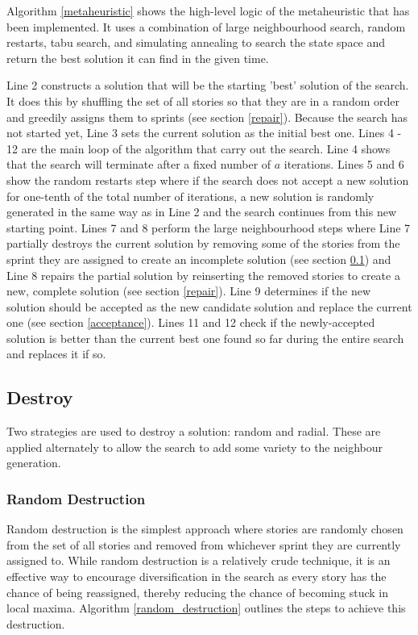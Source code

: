 Algorithm \ref{metaheuristic} shows the high-level logic of the metaheuristic that has been implemented. It uses a combination of large neighbourhood search, random restarts, tabu search, and simulating annealing to search the state space and return the best solution it can find in the given time.

Line 2 constructs a solution that will be the starting 'best' solution of the search. It does this by shuffling the set of all stories so that they are in a random order and greedily assigns them to sprints (see section \ref{repair}). Because the search has not started yet, Line 3 sets the current solution as the initial best one. Lines 4 - 12 are the main loop of the algorithm that carry out the search. Line 4 shows that the search will terminate after a fixed number of $a$ iterations. Lines 5 and 6 show the random restarts step where if the search does not accept a new solution for one-tenth of the total number of iterations, a new solution is randomly generated in the same way as in Line 2 and the search continues from this new starting point. Lines 7 and 8 perform the large neighbourhood steps where Line 7 partially destroys the current solution by removing some of the stories from the sprint they are assigned to create an incomplete solution (see section \ref{destroy}) and Line 8 repairs the partial solution by reinserting the removed stories to create a new, complete solution (see section \ref{repair}). Line 9 determines if the new solution should be accepted as the new candidate solution and replace the current one (see section \ref{acceptance}). Lines 11 and 12 check if the newly-accepted solution is better than the current best one found so far during the entire search and replaces it if so.

\subsection{Destroy} \label{destroy}

Two strategies are used to destroy a solution: random and radial. These are applied alternately to allow the search to add some variety to the neighbour generation.

\subsubsection{Random Destruction}

Random destruction is the simplest approach where stories are randomly chosen from the set of all stories and removed from whichever sprint they are currently assigned to. While random destruction is a relatively crude technique, it is an effective way to encourage diversification in the search as every story has the chance of being reassigned, thereby reducing the chance of becoming stuck in local maxima. Algorithm \ref{random_destruction} outlines the steps to achieve this destruction.

